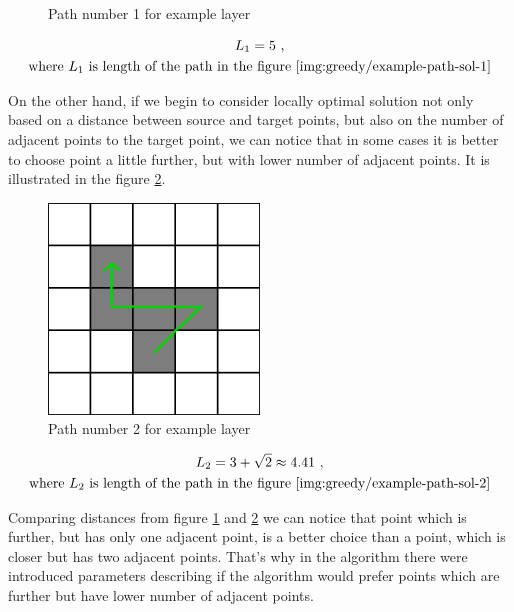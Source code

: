 \documentclass[titlepage]{article}
\newcommand{\multifigcaption}{\captionsetup{justification=justified}}
\begin{document}
\begin{figure}[H]
\begin{center}
\begin{minipage}{.45\linewidth}
			\multifigcaption
			\caption{Path number 1 for example layer}
			\label{img:greedy/example-path-sol-1}
		\end{minipage}
	\end{center}
\end{figure}

\begin{gather*}
	L_1 = 5 \mbox{ ,} \\
	\mbox{where }L_1 \mbox{ is length of the path in the figure \ref{img:greedy/example-path-sol-1}}
\end{gather*}



On the other hand, if we begin to consider locally optimal solution not only based on a distance between source and target points, but also on the number of adjacent points to the target point, we can notice that in some cases it is better to choose point a little further, but with lower number of adjacent points. It is illustrated in the figure \ref{img:greedy/example-path-sol-2}.

\begin{figure}[H]
	\begin{center}
		\includegraphics[width=0.5\textwidth]{img/greedy/example-path-sol-2}
		\caption{Path number 2 for example layer}
		\label{img:greedy/example-path-sol-2}
	\end{center}
\end{figure}

\begin{gather*}
	L_2 = 3 + \sqrt{2} \approx 4.41 \mbox{ ,} \\
	\mbox{where }L_2 \mbox{ is length of the path in the figure \ref{img:greedy/example-path-sol-2}}
\end{gather*}

Comparing distances from figure \ref{img:greedy/example-path-sol-1} and \ref{img:greedy/example-path-sol-2}  we can notice that point which is further, but has only one adjacent point, is a better choice than a point, which is closer but has two adjacent points. That's why in the algorithm there were introduced parameters describing if the algorithm would prefer points which are further but have lower number of adjacent points. 
\end{document}
